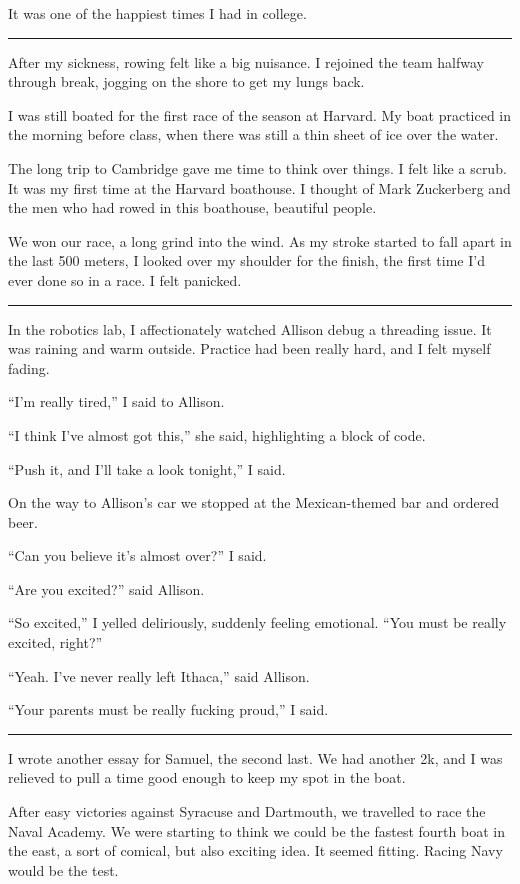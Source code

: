 It was one of the happiest times I had in college.

\plainfancybreak{12pt}{2}{}

After my sickness, rowing felt like a big nuisance.  I rejoined the team halfway
through break, jogging on the shore to get my lungs back.  

I was still boated for the first race of the season at Harvard.  My boat
practiced in the morning before class, when there was still a thin sheet of ice
over the water.

The long trip to Cambridge gave me time to think over things.  I felt like a
scrub.  It was my first time at the Harvard boathouse.  I thought of Mark
Zuckerberg and the men who had rowed in this boathouse, beautiful people. 

We won our race, a long grind into the wind.  As my stroke started to fall apart
in the last 500 meters, I looked over my shoulder for the finish, the first time
I'd ever done so in a race.  I felt panicked.

\plainfancybreak{12pt}{2}{}

In the robotics lab, I affectionately watched Allison debug a threading issue.
It was raining and warm outside.  Practice had been really hard, and I felt
myself fading.

``I'm really tired,'' I said to Allison.

``I think I've almost got this,'' she said, highlighting a block of code.

``Push it, and I'll take a look tonight,'' I said.

On the way to Allison's car we stopped at the Mexican-themed bar and ordered
beer.

``Can you believe it's almost over?'' I said.

``Are you excited?'' said Allison.

``So excited,'' I yelled deliriously, suddenly feeling emotional.  ``You must be
really excited, right?''

``Yeah.  I've never really left Ithaca,'' said Allison.

``Your parents must be really fucking proud,'' I said.

\plainfancybreak{12pt}{2}{}


I wrote another essay for Samuel, the second last.  We had another 2k, and I was
relieved to pull a time good enough to keep my spot in the boat.

After easy victories against Syracuse and Dartmouth, we travelled to race the
Naval Academy.  We were starting to think we could be the fastest fourth boat in
the east, a sort of comical, but also exciting idea.  It seemed fitting.  Racing
Navy would be the test.

